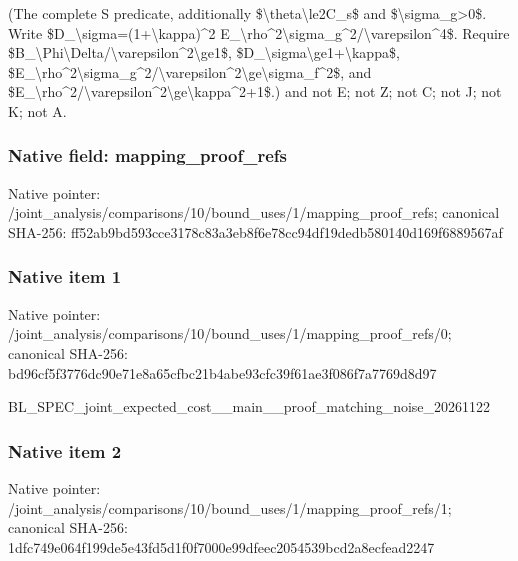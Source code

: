 \documentclass[10pt,a4paper]{article}
\begin{document}
(The complete S predicate, additionally \$\textbackslash{}theta\textbackslash{}le2C\_s\$ and \$\textbackslash{}sigma\_g>0\$. Write \$D\_\textbackslash{}sigma=(1+\textbackslash{}kappa)\textasciicircum{}2 E\_\textbackslash{}rho\textasciicircum{}2\textbackslash{}sigma\_g\textasciicircum{}2/\textbackslash{}varepsilon\textasciicircum{}4\$. Require \$B\_\textbackslash{}Phi\textbackslash{}Delta/\textbackslash{}varepsilon\textasciicircum{}2\textbackslash{}ge1\$, \$D\_\textbackslash{}sigma\textbackslash{}ge1+\textbackslash{}kappa\$, \$E\_\textbackslash{}rho\textasciicircum{}2\textbackslash{}sigma\_g\textasciicircum{}2/\textbackslash{}var\allowbreak{}epsilon\textasciicircum{}2\textbackslash{}ge\textbackslash{}sigma\_f\textasciicircum{}2\$, and \$E\_\textbackslash{}rho\textasciicircum{}2/\textbackslash{}varepsilon\textasciicircum{}2\textbackslash{}ge\textbackslash{}kappa\textasciicircum{}2+1\$.) and not E; not Z; not C; not J; not K; not A.


\subsubsection{Native field: mapping\_proof\_refs}


Native pointer: /joint\_analysis/comparis\allowbreak{}ons/10/bound\_uses/1/mapp\allowbreak{}ing\_proof\_refs; canonical SHA-256: ff52ab9bd593cce3178c83a3\allowbreak{}eb8f6e78cc94df19dedb5801\allowbreak{}40d169f6889567af



\subsubsection{Native item 1}


Native pointer: /joint\_analysis/comparis\allowbreak{}ons/10/bound\_uses/1/mapp\allowbreak{}ing\_proof\_refs/0; canonical SHA-256: bd96cf5f3776dc90e71e8a65\allowbreak{}cfbc21b4abe93cfc39f61ae3\allowbreak{}f086f7a7769d8d97


BL\_SPEC\_joint\_expected\_c\allowbreak{}ost\_\_main\_\_proof\_matchin\allowbreak{}g\_noise\_20261122


\subsubsection{Native item 2}


Native pointer: /joint\_analysis/comparis\allowbreak{}ons/10/bound\_uses/1/mapp\allowbreak{}ing\_proof\_refs/1; canonical SHA-256: 1dfc749e064f199de5e43fd5\allowbreak{}d1f0f7000e99dfeec2054539\allowbreak{}bcd2a8ecfead2247
\end{document}
